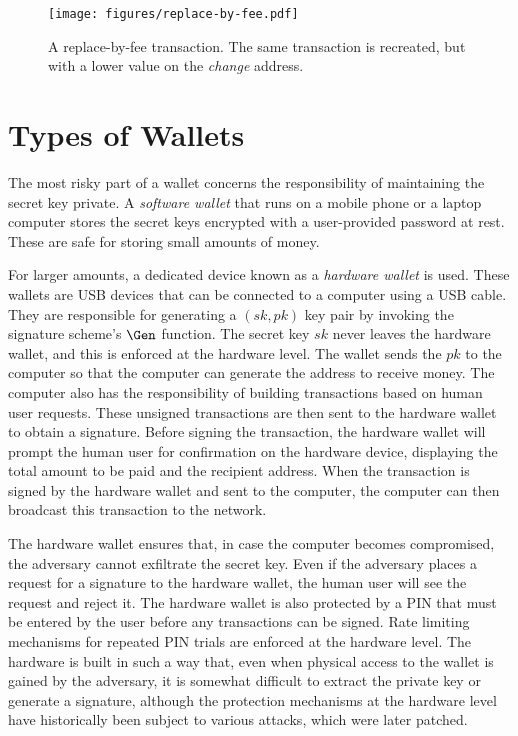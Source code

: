 \begin{figure}[h]
  \centering
  \texttt{[image: figures/replace-by-fee.pdf]}
  \caption{A replace-by-fee transaction. The same transaction is recreated, but with
           a lower value on the \emph{change} address.}
  \label{fig.replace-by-fee}
\end{figure}

\section{Types of Wallets}

The most risky part of a wallet concerns the responsibility of maintaining the
secret key private. A \emph{software wallet} that runs on a mobile phone or a
laptop computer stores the secret keys encrypted with a user-provided password
at rest. These are safe for storing small amounts of money.

For larger amounts,
a dedicated device known as a \emph{hardware wallet}
is used. These wallets are USB devices that can be connected to a computer
using a USB cable. They are responsible for generating a $(sk, pk)$ key pair
by invoking the signature scheme's $\Gen$ function. The secret key $sk$ never
leaves the hardware wallet, and this is enforced at the hardware level. The
wallet sends the $pk$ to the computer so that the computer can generate the
address to receive money. The computer also has the responsibility
of building transactions based on human user requests. These unsigned
transactions are then sent to the hardware wallet to obtain a signature.
Before signing the transaction, the hardware wallet will prompt the human
user for confirmation on the hardware device, displaying the total amount
to be paid and the recipient address. When the transaction is signed by
the hardware wallet and sent to the computer, the computer can then
broadcast this transaction to the network.

The hardware wallet ensures that, in case the computer becomes compromised,
the adversary cannot exfiltrate the secret key. Even if the adversary
places a request for a signature to the hardware wallet, the human user
will see the request and reject it. The hardware wallet is also protected
by a PIN that must be entered by the user before any transactions can be
signed. Rate limiting mechanisms for repeated PIN trials are enforced at
the hardware level. The hardware is built in such a way that, even when physical
access to the wallet is gained by the adversary, it is somewhat difficult
to extract the private key or generate a signature, although the protection
mechanisms at the hardware level have historically been subject to various
attacks, which were later patched.

